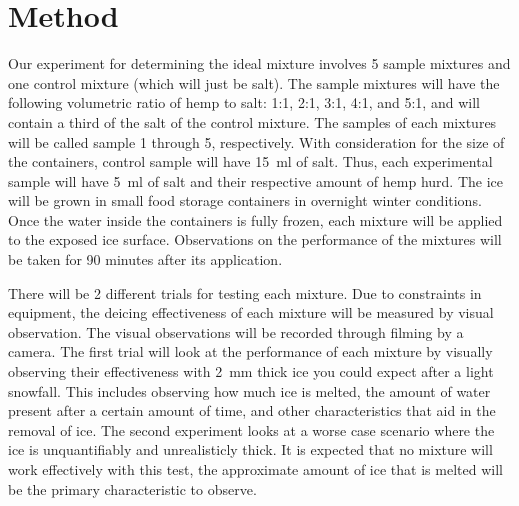 \section*{Method}

Our experiment for determining the ideal mixture involves 5 sample mixtures and one control mixture (which will just be salt).
The sample mixtures will have the following volumetric ratio of hemp to salt: 1:1, 2:1, 3:1, 4:1, and 5:1, and will contain a third of the salt of the control mixture. 
The samples of each mixtures will be called sample 1 through 5, respectively.
With consideration for the size of the containers, control sample will have \SI{15}{\ml} of salt.
Thus, each experimental sample will have \SI{5}{\ml} of salt and their respective amount of hemp hurd.
The ice will be grown in small food storage containers in overnight winter conditions.
Once the water inside the containers is fully frozen, each mixture will be applied to the exposed ice surface.
Observations on the performance of the mixtures will be taken for 90 minutes after its application.

There will be 2 different trials for testing each mixture.
Due to constraints in equipment, the deicing effectiveness of each mixture will be measured by visual observation.
The visual observations will be recorded through filming by a camera.
The first trial will look at the performance of each mixture by visually observing their effectiveness with \SI{2}{\mm} thick ice you could expect after a light snowfall.
This includes observing how much ice is melted, the amount of water present after a certain amount of time, and other characteristics that aid in the removal of ice.
The second experiment looks at a worse case scenario where the ice is unquantifiably and unrealisticly thick.
It is expected that no mixture will work effectively with this test, the approximate amount of ice that is melted will be the primary characteristic to observe.